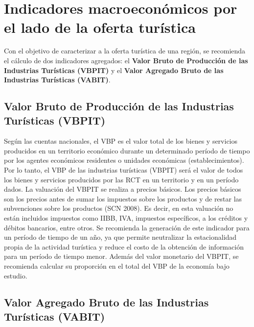 \documentclass[
  openany]{book}
\begin{document}
\hypertarget{indicadores-macroeconuxf3micos-por-el-lado-de-la-oferta-turuxedstica}{%
\section{Indicadores macroeconómicos por el lado de la oferta turística}\label{indicadores-macroeconuxf3micos-por-el-lado-de-la-oferta-turuxedstica}}

Con el objetivo de caracterizar a la oferta turística de una región, se recomienda el cálculo de dos indicadores agregados: el \textbf{Valor Bruto de Producción de las Industrias Turísticas (VBPIT)} y el \textbf{Valor Agregado Bruto de las Industrias Turísticas (VABIT)}.

\hypertarget{valor-bruto-de-producciuxf3n-de-las-industrias-turuxedsticas-vbpit}{%
\subsection{Valor Bruto de Producción de las Industrias Turísticas (VBPIT)}\label{valor-bruto-de-producciuxf3n-de-las-industrias-turuxedsticas-vbpit}}

Según las cuentas nacionales, el VBP es el valor total de los bienes y servicios producidos en un territorio económico durante un determinado período de tiempo por los agentes económicos residentes o unidades económicas (establecimientos). Por lo tanto, el VBP de las industrias turísticas (VBPIT) será el valor de todos los bienes y servicios producidos por las RCT en un territorio y en un período dados. La valuación del VBPIT se realiza a precios básicos. Los precios básicos son los precios antes de sumar los impuestos sobre los productos y de restar las subvenciones sobre los productos (SCN 2008). Es decir, en esta valuación no están incluidos impuestos como IIBB, IVA, impuestos específicos, a los créditos y débitos bancarios, entre otros. Se recomienda la generación de este indicador para un período de tiempo de un año, ya que permite neutralizar la estacionalidad propia de la actividad turística y reduce el costo de la obtención de información para un período de tiempo menor. Además del valor monetario del VBPIT, se recomienda calcular su proporción en el total del VBP de la economía bajo estudio.

\hypertarget{valor-agregado-bruto-de-las-industrias-turuxedsticas-vabit}{%
\subsection{Valor Agregado Bruto de las Industrias Turísticas (VABIT)}\label{valor-agregado-bruto-de-las-industrias-turuxedsticas-vabit}}
\end{document}
